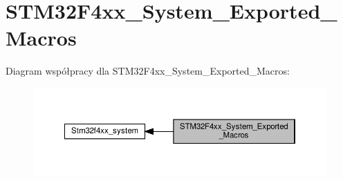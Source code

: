 \hypertarget{group___s_t_m32_f4xx___system___exported___macros}{}\section{S\+T\+M32\+F4xx\+\_\+\+System\+\_\+\+Exported\+\_\+\+Macros}
\label{group___s_t_m32_f4xx___system___exported___macros}
Diagram współpracy dla S\+T\+M32\+F4xx\+\_\+\+System\+\_\+\+Exported\+\_\+\+Macros\+:\nopagebreak
\begin{figure}[H]
\begin{center}
\leavevmode
\includegraphics[width=350pt]{group___s_t_m32_f4xx___system___exported___macros}
\end{center}
\end{figure}

